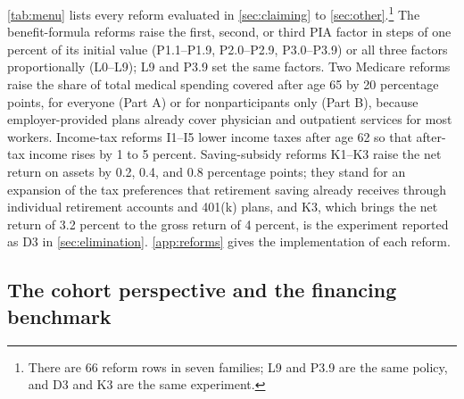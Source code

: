 \autoref{tab:menu} lists every reform evaluated in \autoref{sec:claiming} to \autoref{sec:other}.\footnote{There are 66 reform rows in seven families; L9 and P3.9 are the same policy, and D3 and K3 are the same experiment.} %
The benefit-formula reforms raise the first, second, or third PIA factor in steps of one percent of its initial value (P1.1--P1.9, P2.0--P2.9, P3.0--P3.9) or all three factors proportionally (L0--L9); L9 and P3.9 set the same factors. %
Two Medicare reforms raise the share of total medical spending covered after age 65 by 20 percentage points, for everyone (Part A) or for nonparticipants only (Part B), because employer-provided plans already cover physician and outpatient services for most workers. %
Income-tax reforms I1--I5 lower income taxes after age 62 so that after-tax income rises by 1 to 5 percent. %
Saving-subsidy reforms K1--K3 raise the net return on assets by 0.2, 0.4, and 0.8 percentage points; they stand for an expansion of the tax preferences that retirement saving already receives through individual retirement accounts and 401(k) plans, and K3, which brings the net return of 3.2 percent to the gross return of 4 percent, is the experiment reported as D3 in \autoref{sec:elimination}. %
\autoref{app:reforms} gives the implementation of each reform.



\subsection{The cohort perspective and the financing benchmark}\label{subsec:cohort}

